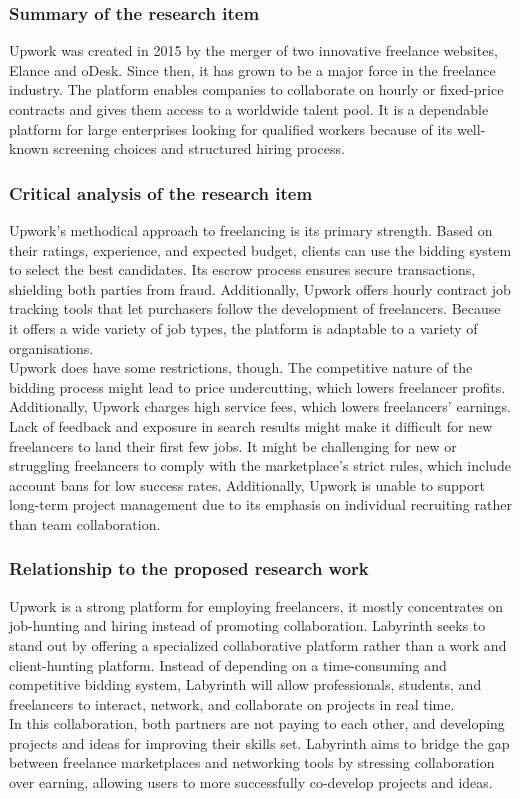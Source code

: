 \documentclass{FastFyp}
\begin{document}
\subsubsection{Summary of the research item}
Upwork was created in 2015 by the merger of two innovative freelance websites, Elance and oDesk.  Since then, it has grown to be a major force in the freelance industry.  The platform enables companies to collaborate on hourly or fixed-price contracts and gives them access to a worldwide talent pool.  It is a dependable platform for large enterprises looking for qualified workers because of its well-known screening choices and structured hiring process.
\subsubsection{Critical analysis of the research item}
Upwork's methodical approach to freelancing is its primary strength.   Based on their ratings, experience, and expected budget, clients can use the bidding system to select the best candidates.   Its escrow process ensures secure transactions, shielding both parties from fraud.   Additionally, Upwork offers hourly contract job tracking tools that let purchasers follow the development of freelancers.   Because it offers a wide variety of job types, the platform is adaptable to a variety of organisations. \\
Upwork does have some restrictions, though.   The competitive nature of the bidding process might lead to price undercutting, which lowers freelancer profits.   Additionally, Upwork charges high service fees, which lowers freelancers' earnings.   Lack of feedback and exposure in search results might make it difficult for new freelancers to land their first few jobs.   It might be challenging for new or struggling freelancers to comply with the marketplace's strict rules, which include account bans for low success rates.   Additionally, Upwork is unable to support long-term project management due to its emphasis on individual recruiting rather than team collaboration.
\subsubsection{Relationship to the proposed research work}
Upwork is a strong platform for employing freelancers, it mostly concentrates on job-hunting and hiring instead of promoting collaboration. Labyrinth seeks to stand out by offering a specialized collaborative platform rather than a work and client-hunting platform. Instead of depending on a time-consuming and competitive bidding system, Labyrinth will allow professionals, students, and freelancers to interact, network, and collaborate on projects in real time. \\
In this collaboration, both partners are not paying to each other, and developing projects and ideas for improving their skills set. Labyrinth aims to bridge the gap between freelance marketplaces and networking tools by stressing collaboration over earning, allowing users to more successfully co-develop projects and ideas.
\end{document}

